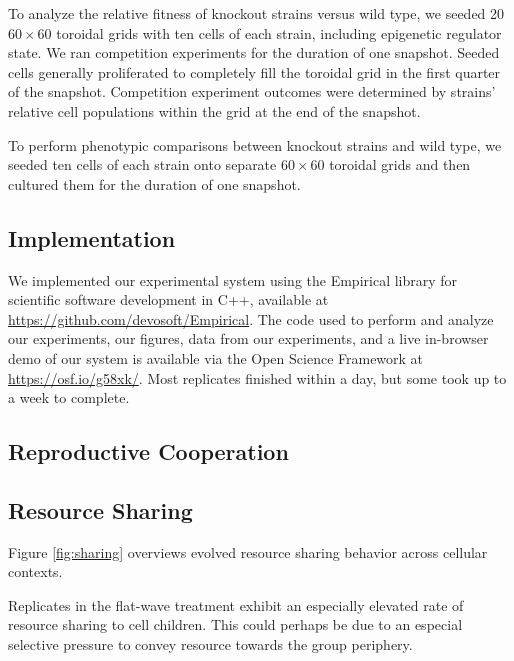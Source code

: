 To analyze the relative fitness of knockout strains versus wild type, we seeded 20 $60 \times 60$ toroidal grids with ten cells of each strain, including epigenetic regulator state.
We ran competition experiments for the duration of one snapshot.
Seeded cells generally proliferated to completely fill the toroidal grid in the first quarter of the snapshot.
Competition experiment outcomes were determined by strains' relative cell populations within the grid at the end of the snapshot.

To perform phenotypic comparisons between knockout strains and wild type, we seeded ten cells of each strain onto separate $60 \times 60$ toroidal grids and then cultured them for the duration of one snapshot.

\subsection{Implementation} \label{sup:implementation}

We implemented our experimental system using the Empirical library for scientific software development in C++, available at \url{https://github.com/devosoft/Empirical}.
The code used to perform and analyze our experiments, our figures, data from our experiments, and a live in-browser demo of our system is available via the Open Science Framework at \url{https://osf.io/g58xk/}.
Most replicates finished within a day, but some took up to a week to complete.

\subsection{Reproductive Cooperation} \label{sup:reproductive-cooperation}



\subsection{Resource Sharing} \label{sec:resource-sharing}




Figure \ref{fig:sharing} overviews evolved resource sharing behavior across cellular contexts.

Replicates in the flat-wave treatment exhibit an especially elevated rate of resource sharing to cell children.
This could perhaps be due to an especial selective pressure to convey resource towards the group periphery.

